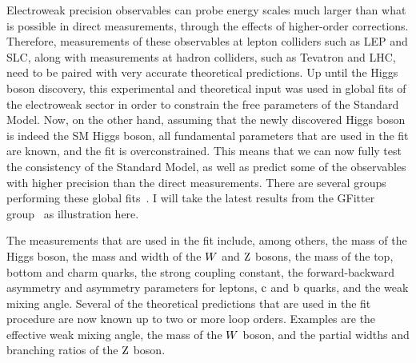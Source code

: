 Electroweak precision observables can probe energy scales much larger than what is possible in
direct measurements, through the effects of higher-order corrections. 
Therefore, measurements of these observables at lepton colliders such as LEP and SLC, along with
measurements at hadron colliders, such as Tevatron and LHC, need to be paired with
very accurate theoretical predictions.
Up until the Higgs boson discovery, this experimental and theoretical input was used in global fits
of the electroweak sector in order to constrain the free parameters of the Standard Model.
Now, on the other hand, assuming that the newly discovered Higgs boson is indeed the SM Higgs boson,
all fundamental parameters that are used in the fit are known, and the fit is overconstrained. This
means that we can now fully test the consistency of the Standard Model, as well as predict some of
the observables with higher precision than the direct measurements. 
There are several groups performing these global
fits~\cite{CKMFitter,GFitter,ZFitter,LEPEWWG}. I will take the latest results from the GFitter
group~\cite{Baak:2014ora,Flacher:2008zq} as illustration here.

The measurements that are used in the fit include, among others, the mass of the Higgs boson, the
mass and width of the $W$ and $\mathrm{Z}$ bosons, the mass of the top, bottom and charm quarks, the
strong coupling constant, the forward-backward asymmetry and asymmetry parameters for leptons,
$\mathrm{c}$ and $\mathrm{b}$ quarks, and the weak mixing angle. 
Several of the theoretical predictions that are used in the fit procedure are now known up to two
or more loop orders. Examples are the effective weak mixing angle, the mass of the $W$ boson, and
the partial widths and branching ratios of the $\mathrm{Z}$ boson. 

